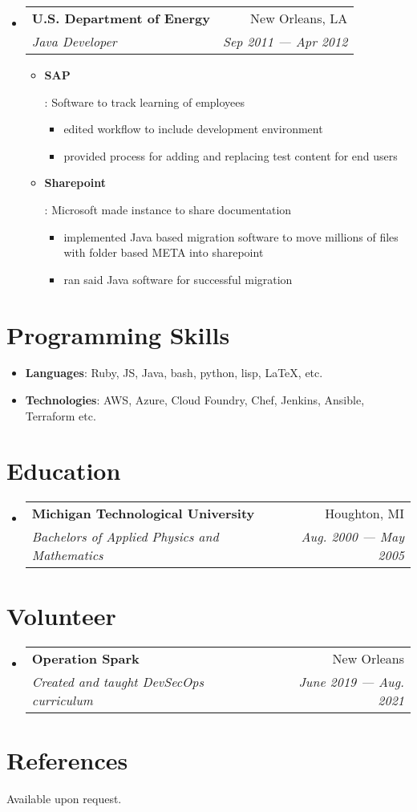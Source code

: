 \documentclass[letterpaper, 10pt]{extarticle}
\makeatletter
\newcommand{\resumeItem}[2]{
\item\small{
    \textbf{#1}{: #2 \vspace{-2pt}}
  }
}
\newcommand{\resumeSubheading}[4]{
  \vspace{-1pt}\item{
    \begin{tabular*}{0.97\textwidth}{l@{\extracolsep{\fill}}r}
      \textbf{#1} & #2 \\
      \textit{\small#3} & \textit{\small #4} \\
    \end{tabular*}\vspace{-5pt}}
}
\newcommand{\resumeSubHeadingListStart}{\begin{itemize}[leftmargin=*]}
\newcommand{\resumeSubHeadingListEnd}{\end{itemize}}
\newcommand{\resumeItemListStart}{\justify\begin{itemize}}
\newcommand{\resumeItemListEnd}{\end{itemize}\vspace{-5pt}}
\makeatother
\begin{document}
\resumeSubHeadingListStart
\resumeSubheading
{U.S. Department of Energy}{New Orleans, LA}
{Java Developer}{Sep 2011 --- Apr 2012}
\resumeItemListStart
\resumeItem{SAP}
{Software to track learning of employees

  \begin{itemize}
    \item edited workflow to include development environment
    \item provided process for adding and replacing test content for end users
  \end{itemize}

}

\resumeItem{Sharepoint}
{Microsoft made instance to share documentation

  \begin{itemize}
    \item implemented Java based migration software to move millions of files with folder based META into sharepoint
    \item ran said Java software for successful migration
  \end{itemize}

}
\resumeItemListEnd
\resumeSubHeadingListEnd


\section{Programming Skills}
\resumeSubHeadingListStart
\item{
            \textbf{Languages}{: Ruby, JS, Java, bash, python, lisp, \LaTeX, etc.}
      }
\item{
            \textbf{Technologies}{: AWS, Azure, Cloud Foundry, Chef, Jenkins, Ansible, Terraform etc.}
      }
\resumeSubHeadingListEnd

\section{Education}
\resumeSubHeadingListStart
\resumeSubheading
{Michigan Technological University}{Houghton, MI}
{Bachelors of Applied Physics and Mathematics}{Aug. 2000 --- May 2005}
\resumeSubHeadingListEnd

\section{Volunteer}
\resumeSubHeadingListStart
\resumeSubheading
{Operation Spark}{New Orleans}
{Created and taught DevSecOps curriculum}{June 2019 --- Aug. 2021}
\resumeSubHeadingListEnd


\section{References}
Available upon request.

\end{document}
